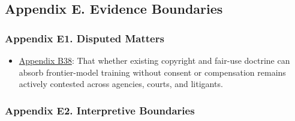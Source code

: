 \documentclass[
  american,
  11pt,
  letterpaper,
]{article}
\providecommand{\tightlist}{%
  \setlength{\itemsep}{0pt}\setlength{\parskip}{0pt}}
\begin{document}
\subsection{Appendix E. Evidence
Boundaries}\label{appendix-e.-evidence-boundaries-10}

\subsubsection{Appendix E1. Disputed
Matters}\label{ch-10-appendix-e1-disputed-matters}

\begin{itemize}
\tightlist
\item
  \hyperref[ch-10-appendix-b38-whether-existing-copyright-and-fair-use-doctrine-can-absorb-frontier-model-traini]{Appendix
  B38}: That whether existing copyright and fair-use doctrine can absorb
  frontier-model training without consent or compensation remains
  actively contested across agencies, courts, and litigants.
\end{itemize}

\subsubsection{Appendix E2. Interpretive
Boundaries}\label{ch-10-appendix-e2-interpretive-boundaries}
\end{document}
